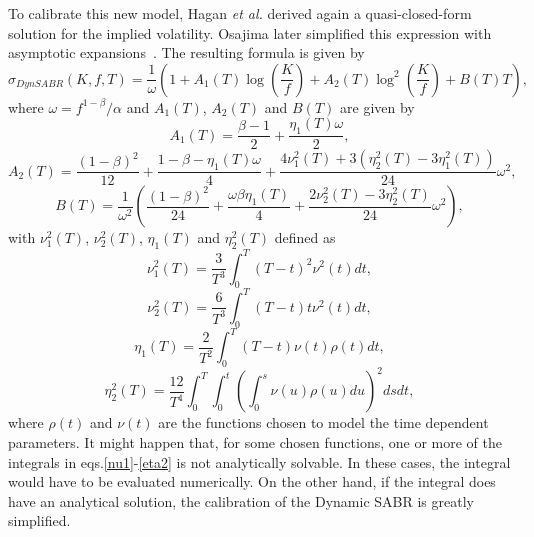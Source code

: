 To calibrate this new model, Hagan \textit{et al.} derived again a quasi-closed-form solution for the implied volatility. Osajima later simplified this expression with asymptotic expansions~\cite{Osajima}. The resulting formula is given by
\begin{equation}\label{dynsabr}
\sigma_{DynSABR}(K,f,T)=\frac{1}{\omega}\left(1+A_1(T)\log\left(\frac{K}{f}\right)+A_2(T)\log^2\left(\frac{K}{f}\right)+B(T)T\right),
\end{equation}
\noindent where $\omega=f^{1-\beta}/\alpha$ and $A_1(T)$, $A_2(T)$ and $B(T)$ are given by
\begin{equation}
A_1(T)=\frac{\beta-1}{2}+\frac{\eta_1(T)\omega}{2},
\end{equation}
\begin{equation}
A_2(T)=\frac{(1-\beta)^2}{12}+\frac{1-\beta-\eta_1(T)\omega}{4}+\frac{4\nu_1^2(T)+3(\eta_2^2(T)-3\eta_1^2(T))}{24}\omega^2,
\end{equation}
\begin{equation}
B(T)=\frac{1}{\omega^2}\left(\frac{(1-\beta)^2}{24}+\frac{\omega\beta\eta_1(T)}{4}+\frac{2\nu_2^2(T)-3\eta_2^2(T)}{24}\omega^2\right),
\end{equation}
\noindent with $\nu_1^2(T)$, $\nu_2^2(T)$, $\eta_1(T)$ and $\eta_2^2(T)$ defined as
\begin{equation}\label{nu1}
\nu_1^2(T)=\frac{3}{T^3}\int_0^T(T-t)^2\nu^2(t)dt,
\end{equation}
\begin{equation}
\nu_2^2(T)=\frac{6}{T^3}\int_0^T(T-t)t\nu^2(t)dt,
\end{equation}
\begin{equation}
\eta_1(T)=\frac{2}{T^2}\int_0^T(T-t)\nu(t)\rho(t)dt,
\end{equation}
\begin{equation}\label{eta2}
\eta_2^2(T)=\frac{12}{T^4}\int_0^T\int_0^t\left(\int_0^s\nu(u)\rho(u)du\right)^2dsdt,
\end{equation}
\noindent where $\rho(t)$ and $\nu(t)$ are the functions chosen to model the time dependent parameters.
It might happen that, for some chosen functions, one or more of the integrals in eqs.\eqref{nu1}-\eqref{eta2} is not analytically  solvable. In these cases, the integral would have to be evaluated numerically. On the other hand, if the integral does have an analytical solution, the calibration of the Dynamic SABR is greatly simplified.

